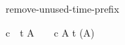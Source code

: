 \begin{circustimelaw}{remove-unused-time-prefix}
\begin{circusaction*}
  c~\circat~t \then A ~ \equiv ~ c \then A \; \provided \; t \notin \FV(A)
\end{circusaction*}
\end{circustimelaw}
